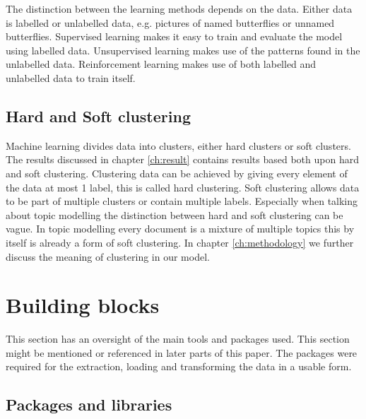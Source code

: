 The distinction between the learning methods depends on the data. Either data is labelled or unlabelled data, e.g. pictures of named butterflies or unnamed butterflies. Supervised learning makes it easy to train and evaluate the model using labelled data. Unsupervised learning makes use of the patterns found in the unlabelled data. Reinforcement learning makes use of both labelled and unlabelled data to train itself. 

\subsection{Hard and Soft clustering}
Machine learning divides data into clusters, either hard clusters or soft clusters. The results discussed in chapter \ref{ch:result} contains results based both upon hard and soft clustering. Clustering data can be achieved by giving every element of the data at most 1 label, this is called hard clustering. Soft clustering allows data to be part of multiple clusters or contain multiple labels. Especially when talking about topic modelling the distinction between hard and soft clustering can be vague. In topic modelling every document is a mixture of multiple topics this by itself is already a form of soft clustering. In chapter \ref{ch:methodology} we further discuss the meaning of clustering in our model.

\section{Building blocks} \label{theory:buildingblocks}
This section has an oversight of the main tools and packages used. This section might be mentioned or referenced in later parts of this paper. The packages were required for the extraction, loading and transforming the data in a usable form.

\subsection{Packages and libraries}


